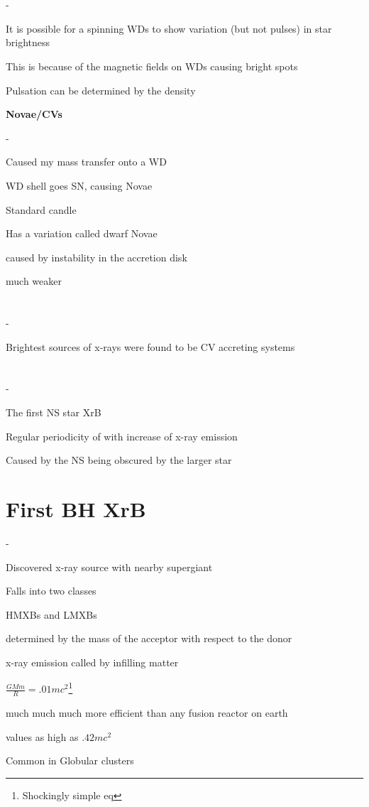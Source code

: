 \section{}
\begin{list}{-}{}
\item It is possible for a spinning WDs to show variation (but not pulses) in star brightness
\item This is because of the magnetic fields on WDs causing bright spots
\item Pulsation can be determined by the density 
\end{list}
\noindent \textbf{\large Novae/CVs}
\begin{list}{-}{}
\item Caused my mass transfer onto a WD
\item WD shell goes SN, causing Novae
\item Standard candle
\item Has a variation called dwarf Novae 
\item caused by instability in the accretion disk
\item much weaker
\end{list}

\section{}
\begin{list}{-}{}
\item Brightest sources of x-rays were found to be CV accreting systems
\end{list}

\section{}
\begin{list}{-}{}
\item The first NS star XrB
\item Regular periodicity of with increase of x-ray emission
\item Caused by the NS being obscured by the larger star
\end{list}

\section{First BH XrB}
\begin{list}{-}{}
\item Discovered x-ray source with nearby supergiant
\item Falls into two classes
\item HMXBs and LMXBs
\item determined by the mass of the acceptor with respect to the donor
\item x-ray emission called by infilling matter
\item \(\frac{GMm}{R} = .01mc^2\)\footnote{Shockingly simple eq}
\item much much much more efficient than any fusion reactor on earth
\item values as high as \(.42mc^2\)
\item Common in Globular clusters
\end{list}

